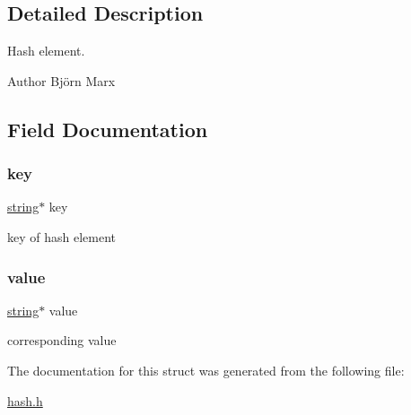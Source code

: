 \subsection{Detailed Description}
Hash element. 

\begin{DoxyAuthor}{Author}
Björn Marx 
\end{DoxyAuthor}


\subsection{Field Documentation}
\mbox{\label{struct_string_hash_struct_ad3cf34b56feec46985e00e0854246e15}} 
\subsubsection{\texorpdfstring{key}{key}}
{\footnotesize\ttfamily \hyperlink{string_8h_a3d2981d9da3e25dd89371059777fdd12}{string}$\ast$ key}



key of hash element 

\mbox{\label{struct_string_hash_struct_ad449ecfeb67fd201ad7ece234f18823b}} 
\subsubsection{\texorpdfstring{value}{value}}
{\footnotesize\ttfamily \hyperlink{string_8h_a3d2981d9da3e25dd89371059777fdd12}{string}$\ast$ value}



corresponding value 



The documentation for this struct was generated from the following file\+:\begin{DoxyCompactItemize}
\item 
\hyperlink{hash_8h}{hash.\+h}\end{DoxyCompactItemize}
